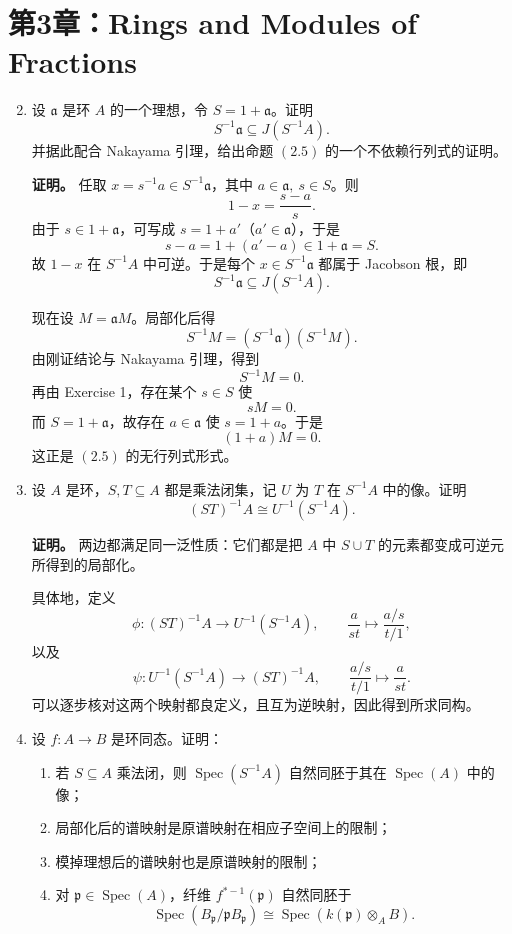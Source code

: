 \documentclass[a4paper]{ctexart}
\begin{document}
\section{第3章：Rings and Modules of Fractions}

\begin{enumerate}[leftmargin=*, label=\textbf{3.\arabic*.}]
\setcounter{enumi}{1}
\item 设 \(\mathfrak a\) 是环 \(A\) 的一个理想，令 \(S=1+\mathfrak a\)。证明
\[
S^{-1}\mathfrak a \subseteq J(S^{-1}A).
\]
并据此配合 Nakayama 引理，给出命题 \((2.5)\) 的一个不依赖行列式的证明。

\textbf{证明。}
任取 \(x=s^{-1}a\in S^{-1}\mathfrak a\)，其中 \(a\in\mathfrak a,\ s\in S\)。则
\[
1-x=\frac{s-a}{s}.
\]
由于 \(s\in 1+\mathfrak a\)，可写成 \(s=1+a'\)（\(a'\in\mathfrak a\)），于是
\[
s-a=1+(a'-a)\in 1+\mathfrak a=S.
\]
故 \(1-x\) 在 \(S^{-1}A\) 中可逆。于是每个 \(x\in S^{-1}\mathfrak a\) 都属于 Jacobson 根，即
\[
S^{-1}\mathfrak a \subseteq J(S^{-1}A).
\]

现在设 \(M=\mathfrak aM\)。局部化后得
\[
S^{-1}M=(S^{-1}\mathfrak a)(S^{-1}M).
\]
由刚证结论与 Nakayama 引理，得到
\[
S^{-1}M=0.
\]
再由 Exercise 1，存在某个 \(s\in S\) 使
\[
sM=0.
\]
而 \(S=1+\mathfrak a\)，故存在 \(a\in\mathfrak a\) 使 \(s=1+a\)。于是
\[
(1+a)M=0.
\]
这正是 \((2.5)\) 的无行列式形式。

\item 设 \(A\) 是环，\(S,T\subseteq A\) 都是乘法闭集，记 \(U\) 为 \(T\) 在 \(S^{-1}A\) 中的像。证明
\[
(ST)^{-1}A \cong U^{-1}(S^{-1}A).
\]

\textbf{证明。}
两边都满足同一泛性质：它们都是把 \(A\) 中 \(S\cup T\) 的元素都变成可逆元所得到的局部化。

具体地，定义
\[
\phi:(ST)^{-1}A\to U^{-1}(S^{-1}A),\qquad \frac{a}{st}\mapsto \frac{a/s}{t/1},
\]
以及
\[
\psi:U^{-1}(S^{-1}A)\to (ST)^{-1}A,\qquad \frac{a/s}{t/1}\mapsto \frac{a}{st}.
\]
可以逐步核对这两个映射都良定义，且互为逆映射，因此得到所求同构。

\setcounter{enumi}{14}
\item 设 \(f:A\to B\) 是环同态。证明：
\begin{enumerate}[label=(\roman*)]
\item 若 \(S\subseteq A\) 乘法闭，则 \(\operatorname{Spec}(S^{-1}A)\) 自然同胚于其在 \(\operatorname{Spec}(A)\) 中的像；
\item 局部化后的谱映射是原谱映射在相应子空间上的限制；
\item 模掉理想后的谱映射也是原谱映射的限制；
\item 对 \(\mathfrak p\in\operatorname{Spec}(A)\)，纤维 \(f^{*-1}(\mathfrak p)\) 自然同胚于
\[
\operatorname{Spec}(B_{\mathfrak p}/\mathfrak p B_{\mathfrak p})
\cong
\operatorname{Spec}(k(\mathfrak p)\otimes_A B).
\]
\end{enumerate}


\end{enumerate}
\end{document}
